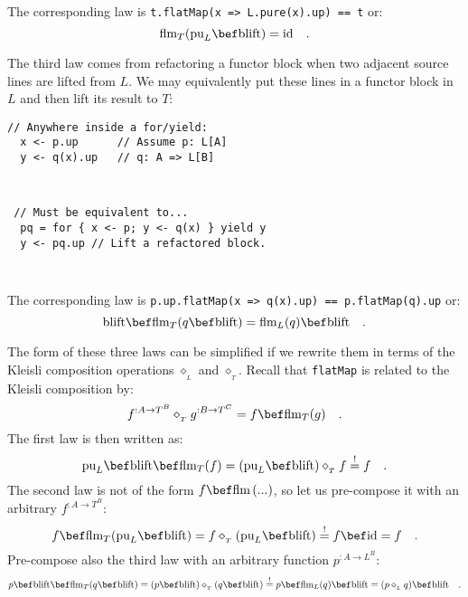 The corresponding law is \lstinline!t.flatMap(x => L.pure(x).up) == t!
or:
\[
\text{flm}_{T}(\text{pu}_{L}\bef\text{blift})=\text{id}\quad.
\]

The third law comes from refactoring a functor block when two adjacent
source lines are lifted from $L$. We may equivalently put these lines
in a functor block in $L$ and then lift its result to $T$:

\vspace{-0.4\baselineskip}

\noindent \texttt{\textcolor{blue}{\footnotesize{}}}%
\begin{minipage}[t]{0.48\columnwidth}%
\textcolor{darkgray}{\footnotesize{}}
\begin{lstlisting}
// Anywhere inside a for/yield:
  x <- p.up      // Assume p: L[A]
  y <- q(x).up   // q: A => L[B]
\end{lstlisting}
%
\end{minipage}\texttt{\textcolor{blue}{\footnotesize{}\hspace*{\fill} }}%
\begin{minipage}[t]{0.48\columnwidth}%
\texttt{\textcolor{blue}{\footnotesize{}}}
\begin{lstlisting}
 // Must be equivalent to...
  pq = for { x <- p; y <- q(x) } yield y
  y <- pq.up // Lift a refactored block.
\end{lstlisting}
%
\end{minipage}\texttt{\textcolor{blue}{\footnotesize{}\smallskip{}
}}{\footnotesize\par}

The corresponding law is \lstinline!p.up.flatMap(x => q(x).up) == p.flatMap(q).up!
or:
\[
\text{blift}\bef\text{flm}_{T}(q\bef\text{blift})=\text{flm}_{L}(q)\bef\text{blift}\quad.
\]

The form of these three laws can be simplified if we rewrite them
in terms of the Kleisli composition operations $\diamond_{_{L}}$
and $\diamond_{_{T}}$. Recall that \lstinline!flatMap! is related
to the Kleisli composition by:
\[
f^{:A\rightarrow T^{B}}\diamond_{_{T}}g^{:B\rightarrow T^{C}}=f\bef\text{flm}_{T}(g)\quad.
\]
The first law is then written as:
\[
\text{pu}_{L}\bef\text{blift}\bef\text{flm}_{T}(f)=(\text{pu}_{L}\bef\text{blift})\diamond_{_{T}}f\overset{!}{=}f\quad.
\]
The second law is not of the form $f\bef\text{flm}\left(...\right)$,
so let us pre-compose it with an arbitrary $f^{:A\rightarrow T^{B}}$:
\[
f\bef\text{flm}_{T}(\text{pu}_{L}\bef\text{blift})=f\diamond_{_{T}}(\text{pu}_{L}\bef\text{blift})\overset{!}{=}f\bef\text{id}=f\quad.
\]
Pre-compose also the third law with an arbitrary function $p^{:A\rightarrow L^{B}}$:
\[
p\bef\text{blift}\bef\text{flm}_{T}(q\bef\text{blift})=(p\bef\text{blift})\diamond_{_{T}}(q\bef\text{blift})\overset{!}{=}p\bef\text{flm}_{L}(q)\bef\text{blift}=(p\diamond_{_{L}}q)\bef\text{blift}\quad.
\]

